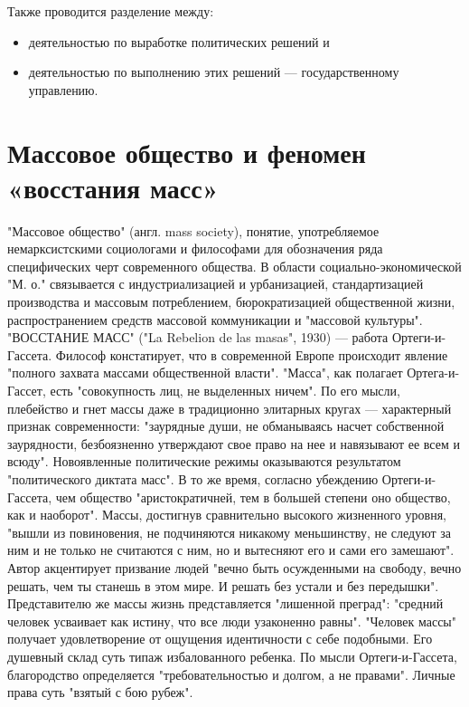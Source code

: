\documentclass[12pt]{article}
\begin{document}
Также проводится разделение между:
\begin{itemize}
\item деятельностью по выработке политических решений и
\item деятельностью по выполнению этих решений — государственному управлению.
\end{itemize}

\newpage
\section{Массовое общество и феномен «восстания масс»}
"Массовое  общество"  (англ.  mass  society),  понятие,  употребляемое  немарксистскими  социологами  и
философами  для  обозначения  ряда  специфических  черт  современного  общества.  В  области  социально-экономической "М. о."  связывается с индустриализацией и урбанизацией,  стандартизацией  производства  и 
массовым  потреблением,  бюрократизацией  общественной  жизни,  распространением  средств  массовой
коммуникации и "массовой культуры".
"ВОССТАНИЕ МАСС" ("La Rebelion de las masas", 1930) — работа Ортеги-и-Гассета. Философ констатирует,
что в современной Европе происходит явление "полного захвата массами общественной власти". "Масса", как
полагает Ортега-и-Гассет, есть "совокупность лиц, не выделенных ничем". По его мысли, плебейство и гнет
массы даже в традиционно элитарных кругах — характерный признак современности: "заурядные души, не
обманываясь насчет собственной заурядности, безбоязненно утверждают свое право на нее и навязывают ее
всем и всюду". Новоявленные политические режимы оказываются результатом "политического диктата масс". В
то же время, согласно убеждению Ортеги-и-Гассета, чем общество "аристократичней, тем в большей степени
оно  общество, как и  наоборот".  Массы, достигнув  сравнительно высокого  жизненного уровня, "вышли  из
повиновения, не подчиняются никакому меньшинству, не следуют за ним и не только не считаются с ним, но и
вытесняют его и  сами его замешают". Автор  акцентирует  призвание  людей "вечно быть  осужденными на
свободу, вечно решать, чем ты станешь в этом мире. И решать без устали и без передышки". Представителю же
массы  жизнь  представляется  "лишенной  преград":  "средний  человек  усваивает  как  истину,  что  все  люди
узаконенно равны". "Человек массы" получает удовлетворение от ощущения идентичности с себе подобными.
Его  душевный  склад  суть  типаж  избалованного  ребенка.  По  мысли  Ортеги-и-Гассета,  благородство
определяется  "требовательностью  и  долгом,  а  не  правами".  Личные  права  суть  "взятый  с  бою  рубеж".
\end{document}
